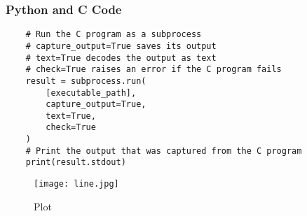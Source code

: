 \documentclass{beamer}
\begin{document}
\begin{frame}[fragile]
\frametitle{Python and C Code}
\begin{lstlisting}
    # Run the C program as a subprocess
    # capture_output=True saves its output
    # text=True decodes the output as text
    # check=True raises an error if the C program fails
    result = subprocess.run(
        [executable_path],
        capture_output=True,
        text=True,
        check=True
    )
    # Print the output that was captured from the C program
    print(result.stdout)
\end{lstlisting}
\end{frame}
\begin{frame}
\begin{figure}
    \centering
    \texttt{[image: line.jpg]}
    \caption{Plot}
    \label{fig:Line}
\end{figure}
\end{frame}
\end{document}
